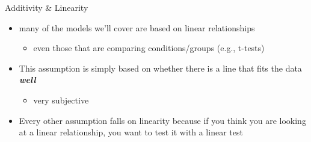 \documentclass[
  ignorenonframetext,
]{beamer}
\providecommand{\tightlist}{%
  \setlength{\itemsep}{0pt}\setlength{\parskip}{0pt}}
\begin{document}
\begin{frame}{Additivity \& Linearity}
\protect\hypertarget{additivity-linearity}{}
\begin{itemize}
\item
  many of the models we'll cover are based on linear relationships

  \begin{itemize}
  \tightlist
  \item
    even those that are comparing conditions/groups (e.g., t-tests)
  \end{itemize}
\item
  This assumption is simply based on whether there is a line that fits
  the data \textbf{\emph{well}}

  \begin{itemize}
  \tightlist
  \item
    very subjective
  \end{itemize}
\item
  Every other assumption falls on linearity because if you think you are
  looking at a linear relationship, you want to test it with a linear
  test
\end{itemize}
\end{frame}
\end{document}
